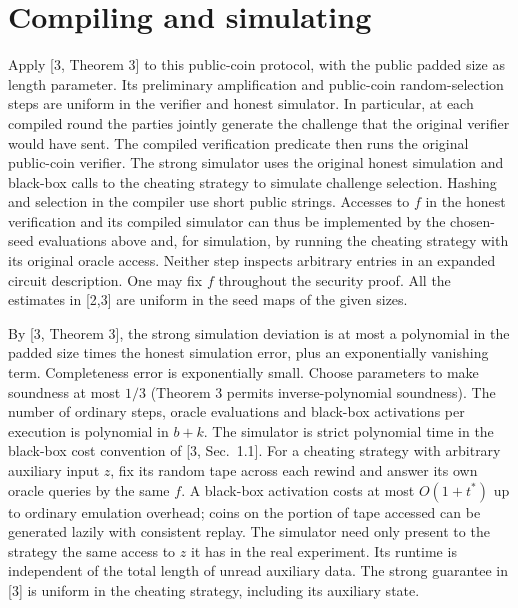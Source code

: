 \documentclass[11pt]{article}
\begin{document}
\section{Compiling and simulating}
Apply [3, Theorem 3] to this public-coin protocol, with the public padded size as length parameter. Its preliminary amplification and public-coin random-selection steps are uniform in the verifier and honest simulator. In particular, at each compiled round the parties jointly generate the challenge that the original verifier would have sent. The compiled verification predicate then runs the original public-coin verifier. The strong simulator uses the original honest simulation and black-box calls to the cheating strategy to simulate challenge selection. Hashing and selection in the compiler use short public strings. Accesses to $f$ in the honest verification and its compiled simulator can thus be implemented by the chosen-seed evaluations above and, for simulation, by running the cheating strategy with its original oracle access. Neither step inspects arbitrary entries in an expanded circuit description. One may fix $f$ throughout the security proof. All the estimates in [2,3] are uniform in the seed maps of the given sizes.

By [3, Theorem 3], the strong simulation deviation is at most a polynomial in the padded size times the honest simulation error, plus an exponentially vanishing term. Completeness error is exponentially small. Choose parameters to make soundness at most $1/3$ (Theorem 3 permits inverse-polynomial soundness). The number of ordinary steps, oracle evaluations and black-box activations per execution is polynomial in $b+k$. The simulator is strict polynomial time in the black-box cost convention of [3, Sec.~1.1]. For a cheating strategy with arbitrary auxiliary input $z$, fix its random tape across each rewind and answer its own oracle queries by the same $f$. A black-box activation costs at most $O(1+t^*)$ up to ordinary emulation overhead; coins on the portion of tape accessed can be generated lazily with consistent replay. The simulator need only present to the strategy the same access to $z$ it has in the real experiment. Its runtime is independent of the total length of unread auxiliary data. The strong guarantee in [3] is uniform in the cheating strategy, including its auxiliary state.
\end{document}
